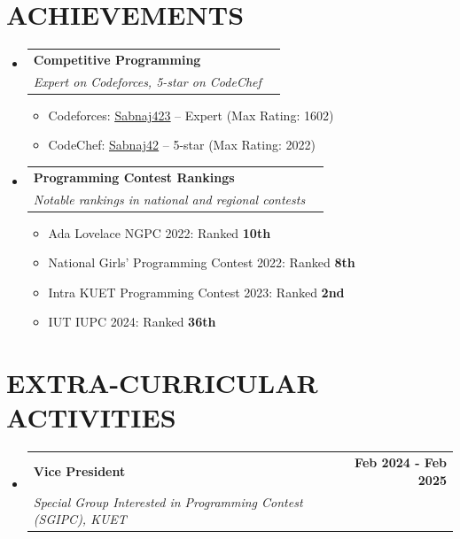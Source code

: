\documentclass[letterpaper,11pt]{article}
\makeatletter
\newcommand{\resumeItem}[1]{
  \item\small{
    {#1 \vspace{-1pt}}
  }
}
\newcommand{\resumeSubheading}[4]{
  \vspace{-2pt}\item
    \begin{tabular*}{1.0\textwidth}[t]{l@{\extracolsep{\fill}}r}
      \textbf{\large#1} & \textbf{\small #2} \\
      \textit{\large#3} & \textit{\small #4} \\
    \end{tabular*}\vspace{-7pt}
}
\newcommand{\resumeSubHeadingListStart}{\begin{itemize}[leftmargin=0.0in, label={}]}
\newcommand{\resumeSubHeadingListEnd}{\end{itemize}}
\newcommand{\resumeItemListStart}{\begin{itemize}[leftmargin=0.1in]}
\newcommand{\resumeItemListEnd}{\end{itemize}\vspace{-5pt}}
\makeatother
\begin{document}
\section{\color{black}ACHIEVEMENTS}
  \resumeSubHeadingListStart
    \resumeSubheading
       {Competitive Programming}{}
       {Expert on Codeforces, 5-star on CodeChef}{}
      \resumeItemListStart
          \resumeItem{\normalsize{Codeforces: \href{https://codeforces.com/profile/Sabnaj_423}{\underline{Sabnaj423}} -- Expert (Max Rating: 1602)}}
          \resumeItem{\normalsize{CodeChef: \href{https://www.codechef.com/users/Sabnaj42}{\underline{Sabnaj42}} -- 5-star (Max Rating: 2022)}}
      \resumeItemListEnd

    \resumeSubheading
       {Programming Contest Rankings}{}
       {Notable rankings in national and regional contests}{}
      \resumeItemListStart
          \resumeItem{\normalsize{Ada Lovelace NGPC 2022: Ranked \textbf{10th}}}
          \resumeItem{\normalsize{National Girls' Programming Contest 2022: Ranked \textbf{8th}}}
          \resumeItem{\normalsize{Intra KUET Programming Contest 2023: Ranked \textbf{2nd}}}
          \resumeItem{\normalsize{IUT IUPC 2024: Ranked \textbf{36th}}}
      \resumeItemListEnd
  \resumeSubHeadingListEnd
\vspace{-12pt}

\section{\color{black}EXTRA-CURRICULAR ACTIVITIES}
  \resumeSubHeadingListStart
    \resumeSubheading
       {Vice President}{Feb 2024 - Feb 2025}
       {Special Group Interested in Programming Contest (SGIPC), KUET}{}
  \resumeSubHeadingListEnd
\vspace{-12pt}
\end{document}
